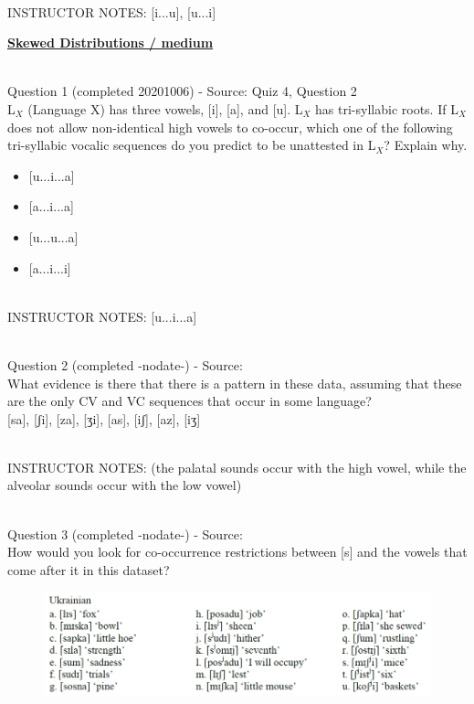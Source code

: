 \documentclass[12pt]{article}
\begin{document}
~\\
INSTRUCTOR NOTES: [i...u], [u...i]


\newpage\textbf{\underline{\huge Skewed Distributions / medium\\}}

~\\

{\large Question 1} (completed 20201006) - Source: Quiz 4, Question 2\\

L$_X$ (Language X) has three vowels, [i], [a], and [u]. L$_X$ has tri-syllabic roots. If L$_X$ does not allow non-identical high vowels to co-occur, which one of the following tri-syllabic vocalic sequences do you predict to be unattested in L$_X$? Explain why.\\

\begin{itemize} \item {[u...i...a]} \item {[a...i...a]} \item {[u...u...a]} \item {[a...i...i]} \end{itemize}


~\\
INSTRUCTOR NOTES: [u...i...a]


~\\

{\large Question 2} (completed -nodate-) - Source: \\

What evidence is there that there is a pattern in these data, assuming that these are the only CV and VC sequences that occur in some language?\\

{[sa]}, {[ʃi]}, {[za]}, {[ʒi]}, {[as]}, {[iʃ]}, {[az]}, {[iʒ]}


~\\
INSTRUCTOR NOTES: (the palatal sounds occur with the high vowel, while the alveolar sounds occur with the low vowel)


~\\

{\large Question 3} (completed -nodate-) - Source: \\

How would you look for co-occurrence restrictions between [s] and the vowels that come after it in this dataset?\\

\begin{figure}[H]
\includegraphics{../images/ukrainian.png}
\end{figure}
\end{document}
